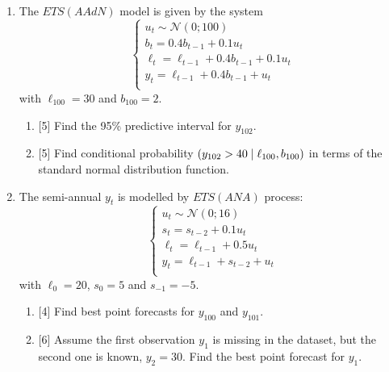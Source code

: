 \documentclass[12pt]{article}
\let\P\relax
\DeclareMathOperator{\P}{\mathbb{P}}
\newcommand{\cN}{\mathcal{N}}
\begin{document}











\begin{enumerate}
\item   The $ETS(AAdN)$ model is given by the system
  \[
  \begin{cases}
  u_t  \sim \cN(0; 100) \\
  b_t = 0.4 b_{t-1} + 0.1 u_t \\
  \ell_t = \ell_{t-1} + 0.4 b_{t-1} + 0.1 u_t \\
  y_t = \ell_{t-1} + 0.4 b_{t-1} + u_t \\
  \end{cases}
  \]
  with $\ell_{100} = 30$ and $b_{100} = 2$.
\begin{enumerate}
  \item {[5]} Find the 95\% predictive interval for $y_{102}$.
  \item {[5]} Find conditional probability $\P(y_{102} > 40 \mid \ell_{100}, b_{100})$ in terms of the standard normal distribution function.
\end{enumerate}

\item   The semi-annual $y_t$ is modelled by $ETS(ANA)$ process:    
    \[
    \begin{cases}
        u_t \sim \cN(0; 16) \\
        s_t = s_{t-2} + 0.1 u_t \\
        \ell_t = \ell_{t-1}  + 0.5 u_t \\
        y_t = \ell_{t-1} + s_{t-2} + u_t \\
    \end{cases}    
    \]
with $\ell_0 = 20$, $s_0 = 5$ and $s_{-1} = -5$.

\begin{enumerate}
    \item {[4]} Find best point forecasts for $y_{100}$ and $y_{101}$.
    \item {[6]} Assume the first observation $y_1$ is missing in the dataset, but the second one is known, $y_2 = 30$. 
    Find the best point forecast for $y_1$.
\end{enumerate}


\end{enumerate}
\end{document}
